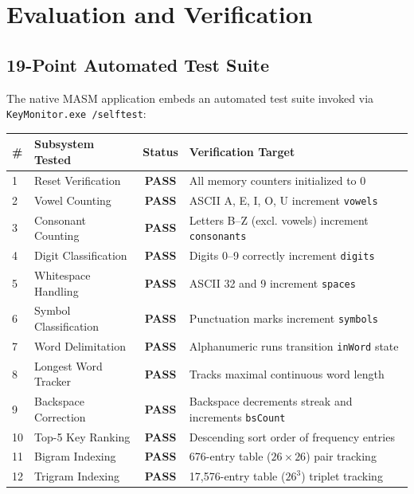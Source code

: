 \documentclass[11pt,a4paper]{article}
\begin{document}
\section{Evaluation and Verification}

\subsection{19-Point Automated Test Suite}
The native MASM application embeds an automated test suite invoked via \texttt{KeyMonitor.exe /selftest}:

\begin{table}[htbp]
\centering
\small
\begin{tabularx}{\textwidth}{llcX}
  \toprule
  \textbf{\#} & \textbf{Subsystem Tested} & \textbf{Status} & \textbf{Verification Target} \\
  \midrule
  1 & Reset Verification & \textbf{PASS} & All memory counters initialized to 0 \\
  2 & Vowel Counting & \textbf{PASS} & ASCII A, E, I, O, U increment \texttt{vowels} \\
  3 & Consonant Counting & \textbf{PASS} & Letters B–Z (excl. vowels) increment \texttt{consonants} \\
  4 & Digit Classification & \textbf{PASS} & Digits 0–9 correctly increment \texttt{digits} \\
  5 & Whitespace Handling & \textbf{PASS} & ASCII 32 and 9 increment \texttt{spaces} \\
  6 & Symbol Classification & \textbf{PASS} & Punctuation marks increment \texttt{symbols} \\
  7 & Word Delimitation & \textbf{PASS} & Alphanumeric runs transition \texttt{inWord} state \\
  8 & Longest Word Tracker & \textbf{PASS} & Tracks maximal continuous word length \\
  9 & Backspace Correction & \textbf{PASS} & Backspace decrements streak and increments \texttt{bsCount} \\
  10 & Top-5 Key Ranking & \textbf{PASS} & Descending sort order of frequency entries \\
  11 & Bigram Indexing & \textbf{PASS} & 676-entry table ($26 \times 26$) pair tracking \\
  12 & Trigram Indexing & \textbf{PASS} & 17,576-entry table ($26^3$) triplet tracking \\

\end{tabularx}
\end{table}
\end{document}
